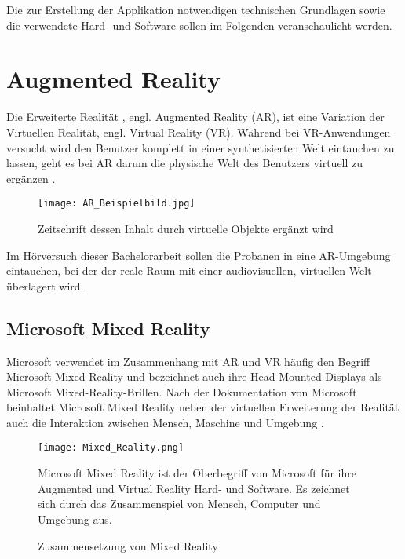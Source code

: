 Die zur Erstellung der Applikation notwendigen technischen Grundlagen sowie die verwendete Hard- und Software sollen im Folgenden veranschaulicht werden. 

 \section{Augmented Reality}
Die Erweiterte Realität , engl. Augmented Reality (AR), ist eine Variation der Virtuellen Realität, engl. Virtual Reality (VR). Während bei VR-Anwendungen versucht wird den Benutzer komplett in einer synthetisierten Welt eintauchen zu lassen, geht es bei AR darum die physische Welt des Benutzers virtuell zu ergänzen \cite{Azura97}. \\

\begin{figure}[H]
\centering
\texttt{[image: AR\_Beispielbild.jpg]}
\caption{Zeitschrift dessen Inhalt durch virtuelle Objekte ergänzt wird}
\label{fig:AR_Beispielbild}
\end{figure}

Im Hörversuch dieser Bachelorarbeit sollen die Probanen in eine AR-Umgebung eintauchen, bei der der reale Raum mit einer audiovisuellen, virtuellen Welt überlagert wird. 
\newpage

\subsection{Microsoft Mixed Reality}
Microsoft verwendet im Zusammenhang mit AR und VR häufig den Begriff Microsoft Mixed Reality und bezeichnet auch ihre Head-Mounted-Displays als Microsoft Mixed-Reality-Brillen. Nach der Dokumentation von Microsoft  beinhaltet Microsoft Mixed Reality neben der virtuellen Erweiterung der Realität auch die Interaktion zwischen Mensch, Maschine und Umgebung \cite{MicrosoftMR}. 


\begin{figure}[H]
\centering
\texttt{[image: Mixed\_Reality.png]}
\caption{Zusammensetzung von Mixed Reality}
Microsoft Mixed Reality ist der Oberbegriff von Microsoft für ihre Augmented und Virtual Reality Hard- und Software. Es zeichnet sich durch das Zusammenspiel von Mensch, Computer und Umgebung aus. 
\label{fig:Mixed_Reality}
\end{figure}
 

